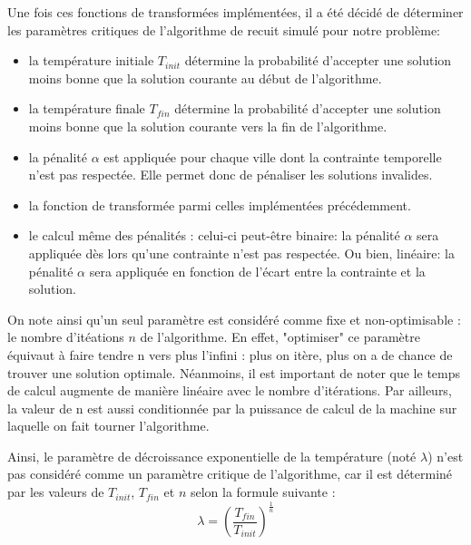 \documentclass[a4paper, 12pt]{article}
\begin{document}
Une fois ces fonctions de transformées implémentées, il a été décidé de déterminer les paramètres critiques de l'algorithme de recuit simulé pour notre problème:
\begin{itemize}
    \item la température initiale $T_{init}$ détermine la probabilité d'accepter une solution moins bonne que la solution courante au début de l'algorithme.
    \item la température finale $T_{fin}$ détermine la probabilité d'accepter une solution moins bonne que la solution courante vers la fin de l'algorithme.
    \item la pénalité $\alpha$ est appliquée  pour chaque ville dont la contrainte temporelle n'est pas respectée. Elle permet donc de pénaliser les solutions invalides.
    \item la fonction de transformée parmi celles implémentées précédemment.
    \item le calcul même des pénalités : celui-ci peut-être binaire: la pénalité $\alpha$ sera appliquée dès lors qu'une contrainte n'est pas respectée. Ou bien, linéaire: la pénalité $\alpha$ sera appliquée en fonction de l'écart entre la contrainte et la solution.
\end{itemize}

On note ainsi qu'un seul paramètre est considéré comme fixe et non-optimisable : le nombre d'itéations $n$ de l'algorithme. En effet, "optimiser" ce paramètre équivaut à faire tendre n vers plus l'infini : plus on itère, plus on a de chance de trouver une solution optimale. Néanmoins, il est important de noter que le temps de calcul augmente de manière linéaire avec le nombre d'itérations.
Par ailleurs, la valeur de n est aussi conditionnée par la puissance de calcul de la machine sur laquelle on fait tourner l'algorithme.

Ainsi, le paramètre de décroissance exponentielle de la température (noté $\lambda$) n'est pas considéré comme un paramètre critique de l'algorithme, car il est déterminé par les valeurs de $T_{init}$, $T_{fin}$ et $n$ selon la formule suivante :
\[
\lambda = \left( \frac{T_{fin}}{T_{init}} \right)^{\frac{1}{n}}
\]
\end{document}
